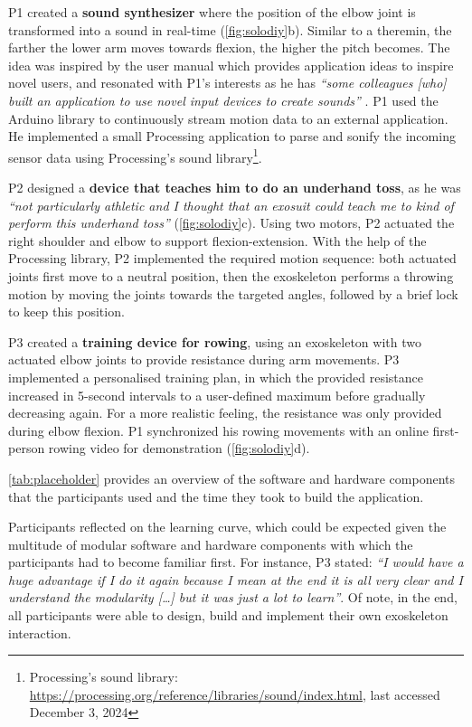 P1 created a \textbf{sound synthesizer} where the position of the elbow joint is transformed into a sound in real-time (\autoref{fig:solodiy}b). 
Similar to a theremin, the farther the lower arm moves towards flexion, the higher the pitch becomes. The idea was inspired by the user manual which provides application ideas to inspire novel users, and resonated with P1's interests as he has \textit{``some colleagues [who] built an application to use novel input devices to create sounds''} .
P1 used the Arduino library to continuously stream motion data to an external application. He implemented a small Processing application to parse and sonify the incoming sensor data using Processing's sound library\footnote{Processing's sound library: \url{https://processing.org/reference/libraries/sound/index.html}, last accessed December 3, 2024}. 

P2 designed a \textbf{device that teaches him to do an underhand toss}, as he was \textit{``not particularly athletic and I thought that an exosuit could teach me to kind of perform this underhand toss''} (\autoref{fig:solodiy}c). Using two motors, P2 actuated the right shoulder and elbow to support flexion-extension.
With the help of the Processing library, P2 implemented the required motion sequence: both actuated joints first move to a neutral position, then the exoskeleton performs a throwing motion by moving the joints towards the targeted angles, followed by a brief lock to keep this position. 

P3 created a \textbf{training device for rowing}, using an exoskeleton with two actuated elbow joints to provide resistance during arm movements. P3 implemented a personalised training plan, in which the provided resistance increased in 5-second intervals to a user-defined maximum before gradually decreasing again. For a more realistic feeling, the resistance was only provided during elbow flexion. P1 synchronized his rowing movements with an online first-person rowing video for demonstration (\autoref{fig:solodiy}d).

\autoref{tab:placeholder} provides an overview of the software and hardware components that the participants used and the time they took to build the application.


Participants reflected on the learning curve, which could be expected given the multitude of modular software and hardware components with which the participants had to become familiar first. For instance, P3 stated: \textit{``I would have a huge advantage if I do it again because I mean at the end it is all very clear and I understand the modularity [\ldots] but it was just a lot to learn''}. 
Of note, in the end, all participants were able to design, build and implement their own exoskeleton interaction. 


